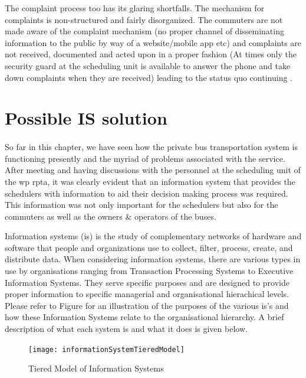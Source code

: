 The complaint process too has its glaring shortfalls. The mechanism for complaints is non-structured and fairly disorganized. The commuters are not made aware of the complaint mechanism (no proper channel of disseminating information to the public by way of a website/mobile app etc) and complaints are not received, documented and acted upon in a proper fashion (At times only the security guard at the scheduling unit is available to answer the phone and take down complaints when they are received) leading to the status quo continuing \cite{Mahesh2013a, Theja2013a, Mahesh2013b, Navaratne2013a, Navaratne2013b, Ranjith2013a}.



\section{Possible IS solution}

\paragraph{} So far in this chapter, we have seen how the private bus transportation system is functioning presently and the myriad of problems associated with the service. After meeting and having discussions with the personnel at the scheduling unit of the \acrshort{wp} \acrshort{rpta}, it was clearly evident that an information system that provides the schedulers with information to aid their decision making process was required. This information was not only important for the schedulers but also for the commuters as well as the owners \& operators of the buses. 

Information systems (\acrshort{is}) is the study of complementary networks of hardware and software that people and organizations use to collect, filter, process, create, and distribute data\cite{Denning1999}. When considering information systems, there are various types in use by organisations ranging from Transaction Processing Systems to Executive Information Systems. They serve specific purposes and are designed to provide proper information to specific managerial and organisational hierachical levels. Please refer to Figure for an illustration of the purposes of the various \acrshort{is}'s and how these Information Systems relate to the organisational hierarchy. A brief description of what each system is and what it does is given below.

\begin{figure}[H]
\centering
\texttt{[image: informationSystemTieredModel]}
\caption[Tiered Model of Information Systems]{Tiered Model of Information Systems \cite{Laudon1988}}
\label{image-informationSystemTieredModel}
\end{figure}

